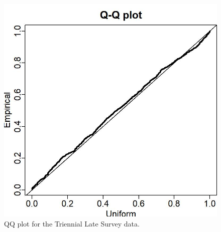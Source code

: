 \documentclass[12pt,]{article}
\begin{document}
\FloatBarrier

\begin{figure}
\centering
\includegraphics{Figures/tri_late_Posterior_Predictive-Histogram-1.jpg}
\caption{QQ plot for the Triennial Late Survey data.
\label{fig:tri_late_qq}}
\end{figure}

\FloatBarrier
\end{document}
